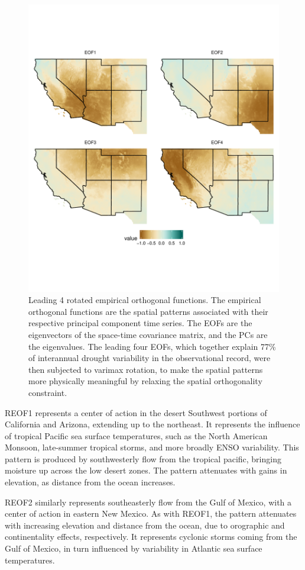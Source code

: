 \documentclass[fleqn,10pt]{wlscirep}
\begin{document}
\begin{figure}[ht]
\centering
\includegraphics[width=.8\linewidth]{figures/reof_observed.pdf}
\caption{Leading 4 rotated empirical orthogonal functions. The empirical orthogonal functions are the spatial patterns associated with their respective principal component time series. The EOFs are the eigenvectors of the space-time covariance matrix, and the PCs are the eigenvalues. The leading four EOFs, which together explain 77\% of interannual drought variability in the observational record, were then subjected to varimax rotation, to make the spatial patterns more physically meaningful by relaxing the spatial orthogonality constraint.}
\label{fig:reofs}
\end{figure}

REOF1 represents a center of action in the desert Southwest portions of California and Arizona, extending up to the northeast. It represents the influence of tropical Pacific sea surface temperatures, such as the North American Monsoon, late-summer tropical storms, and more broadly ENSO variability. This pattern is produced by southwesterly flow from the tropical pacific, bringing moisture up across the low desert zones. The pattern attenuates with gains in elevation, as distance from the ocean increases. 

REOF2 similarly represents southeasterly flow from the Gulf of Mexico, with a center of action in eastern New Mexico. As with REOF1, the pattern attenuates with increasing elevation and distance from the ocean, due to orographic and continentality effects, respectively. It represents cyclonic storms coming from the Gulf of Mexico, in turn influenced by variability in Atlantic sea surface temperatures. 
\end{document}

